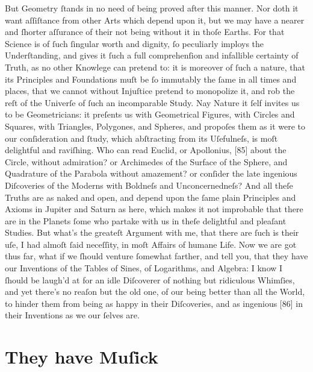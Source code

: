 \documentclass[letterpaper]{book}
\begin{document}
But Geometry ſtands in no need of being proved after this manner. Nor doth
it want aſſiſtance from other Arts which depend upon it, but we may have a
nearer and ſhorter aſſurance of their not being without it in thoſe Earths.
For that Science is of ſuch ſingular worth and dignity, ſo peculiarly
imploys the Underſtanding, and gives it ſuch a full comprehenſion and infallible certainty of Truth, as no other Knowlege can pretend to: it is
moreover of ſuch a nature, that its Principles and Foundations muſt be ſo
immutably the ſame in all times and places, that we cannot without Injuſtice
pretend to monopolize it, and rob the reſt of the Univerſe of ſuch an
incomparable Study. Nay Nature it ſelf invites us to be Geometricians: it
preſents us with Geometrical Figures, with Circles and Squares, with
Triangles, Polygones, and Spheres, and propoſes them as it were to our
conſideration and ſtudy, which abſtracting from its Uſefulneſs, is moſt
delightful and raviſhing. Who can read Euclid, or Apollonius, [85] about
the Circle, without admiration? or Archimedes of the Surface of the Sphere,
and Quadrature of the Parabola without amazement? or conſider the late
ingenious Diſcoveries of the Moderns with Boldneſs and Unconcernedneſs? And
all theſe Truths are as naked and open, and depend upon the ſame plain
Principles and Axioms in Jupiter and Saturn as here, which makes it not
improbable that there are in the Planets ſome who partake with us in theſe
delightful and pleaſant Studies. But what's the greateſt Argument with me,
that there are ſuch is their uſe, I had almoſt ſaid neceſſity, in moſt
Affairs of humane Life.  Now we are got thus far, what if we ſhould venture
ſomewhat farther, and tell you, that they have our Inventions of the Tables
of Sines, of Logarithms, and Algebra: I know I ſhould be laugh'd at for an
idle Diſcoverer of nothing but ridiculous Whimſies, and yet there's no
reaſon but the old one, of our being better than all the World, to hinder
them from being as happy in their Diſcoveries, and as ingenious [86] in
their Inventions as we our ſelves are.


\section{They have Muſick}
\end{document}

